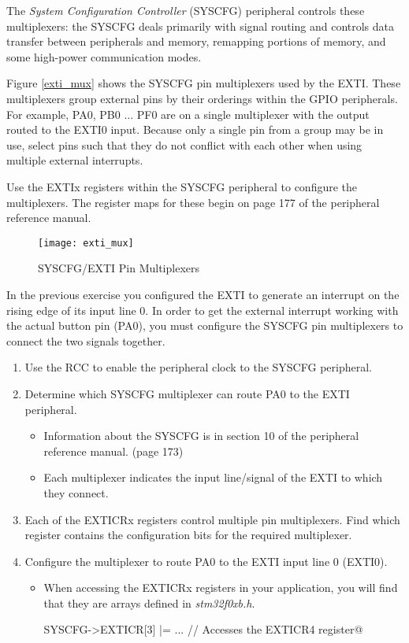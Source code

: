 \documentclass[11pt,fleqn]{book} %
\makeatletter
\newcommand{\ilcode}[1]{
    \smallskip
    \colorbox{gray!20!white}{
        \centering
        \parbox{\linewidth-2\fboxsep}{
            \lstinline@#1@
        }
    }
}
\makeatother
\begin{document}
The \textit{System Configuration Controller} (SYSCFG) peripheral controls these multiplexers: the SYSCFG deals primarily with signal routing and controls data transfer between peripherals and memory, remapping portions of memory, and some high-power communication modes. 

Figure \vref{exti_mux} shows the SYSCFG pin multiplexers used by the EXTI. These multiplexers group external pins by their orderings within the GPIO peripherals. For example, PA0, PB0 ... PF0 are on a single multiplexer with the output routed to the EXTI0 input. Because only a single pin from a group may be in use, select pins such that they do not conflict with each other when using multiple external interrupts.

Use the EXTIx registers within the SYSCFG peripheral to configure the multiplexers. The register maps for these begin on page 177 of the peripheral reference manual. 

\begin{figure}[]
    \centering\texttt{[image: exti\_mux]}
    \caption{SYSCFG/EXTI Pin Multiplexers}
    \label{exti_mux}
\end{figure}

\begin{exercise}
    \label{ex3}
    In the previous exercise you configured the EXTI to generate an interrupt on the rising edge of its input line 0. In order to get the external interrupt working with the actual button pin (PA0), you must configure the SYSCFG pin multiplexers to connect the two signals together. 
    \begin{enumerate}
        \item Use the RCC to enable the peripheral clock to the SYSCFG peripheral.
        \item Determine which SYSCFG multiplexer can route PA0 to the EXTI peripheral.
        \begin{itemize}
            \item Information about the SYSCFG is in section 10 of the peripheral reference manual. (page 173)
            \item Each multiplexer indicates the input line/signal of the EXTI to which they connect.
        \end{itemize}
        \item Each of the EXTICRx registers control multiple pin multiplexers. Find which register contains the configuration bits for the required multiplexer. 
        \item Configure the multiplexer to route PA0 to the EXTI input line 0 (EXTI0).
        \begin{itemize}
            \item When accessing the EXTICRx registers in your application, you will find that they are arrays defined in \textit{stm32f0xb.h}. \\
            \ilcode{SYSCFG->EXTICR[3] |= ...   // Accesses the EXTICR4 register}
        \end{itemize} 
    \end{enumerate}
\end{exercise}
\end{document}
